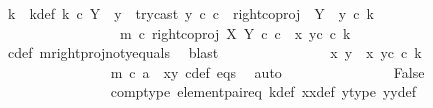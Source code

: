 \begin{isabellebody}
\ k\ \ k{\isacharunderscore}{\kern0pt}def{\isacharcolon}{\kern0pt}\ {\isachardoublequoteopen}k\ {\isasymin}\isactrlsub c\ Y\ {\isasymsetminus}\ {\isacharparenleft}{\kern0pt}{\isasymone}{\isacharcomma}{\kern0pt}y{}{\isacharparenright}{\kern0pt}\ {\isasymand}\ try{\isacharunderscore}{\kern0pt}cast\ y{}\ {\isasymcirc}\isactrlsub c\ c\ {\isacharequal}{\kern0pt}\ right{\isacharunderscore}{\kern0pt}coproj\ {\isasymone}\ {\isacharparenleft}{\kern0pt}Y\ {\isasymsetminus}\ {\isacharparenleft}{\kern0pt}{\isasymone}{\isacharcomma}{\kern0pt}y{}{\isacharparenright}{\kern0pt}{\isacharparenright}{\kern0pt}\ {\isasymcirc}\isactrlsub c\ k\ {\isasymand}\ \isanewline
\ \ \ \ \ \ \ \ \ \ \ \ \ \ \ \ \ m\ {\isasymcirc}\isactrlsub c\ right{\isacharunderscore}{\kern0pt}coproj\ X\ Y\ {\isasymcirc}\isactrlsub c\ c\ {\isacharequal}{\kern0pt}\ {\isasymlangle}x{}{\isacharcomma}{\kern0pt}\ y{}\isactrlsup c\ {\isasymcirc}\isactrlsub c\ k{\isasymrangle}{\isachardoublequoteclose}\isanewline
\ \ \ \ \ \ \ \ \ \ \ \ \ \ \isamarkupfalse%
\ c{\isacharunderscore}{\kern0pt}def\ m{\isacharunderscore}{\kern0pt}rightproj{\isacharunderscore}{\kern0pt}not{\isacharunderscore}{\kern0pt}y{}{\isacharunderscore}{\kern0pt}equals\ \isamarkupfalse%
\ blast\isanewline
\ \ \ \ \ \ \ \ \ \ \ \ \isamarkupfalse%
\ \isamarkupfalse%
\ {\isachardoublequoteopen}{\isasymlangle}x{}{\isacharcomma}{\kern0pt}\ y{}{\isasymrangle}\ {\isacharequal}{\kern0pt}\ {\isasymlangle}x{}{\isacharcomma}{\kern0pt}\ y{}\isactrlsup c\ {\isasymcirc}\isactrlsub c\ k{\isasymrangle}{\isachardoublequoteclose}\isanewline
\ \ \ \ \ \ \ \ \ \ \ \ \ \ \isamarkupfalse%
\ {\isacartoucheopen}m\ {\isasymcirc}\isactrlsub c\ a\ {\isacharequal}{\kern0pt}\ {\isasymlangle}x{}{\isacharcomma}{\kern0pt}y{}{\isasymrangle}{\isacartoucheclose}\ c{\isacharunderscore}{\kern0pt}def\ eqs\ \isamarkupfalse%
\ auto\isanewline
\ \ \ \ \ \ \ \ \ \ \ \ \isamarkupfalse%
\ \isamarkupfalse%
\ False\isanewline
\ \ \ \ \ \ \ \ \ \ \ \ \ \ \isamarkupfalse%
\ comp{\isacharunderscore}{\kern0pt}type\ element{\isacharunderscore}{\kern0pt}pair{\isacharunderscore}{\kern0pt}eq\ k{\isacharunderscore}{\kern0pt}def\ x{}x{}{\isacharunderscore}{\kern0pt}def\ y{}{\isacharprime}{\kern0pt}{\isacharunderscore}{\kern0pt}type\ y{}y{}{\isacharunderscore}{\kern0pt}def{\isacharparenleft}{\kern0pt}{}{\isacharparenright}{\kern0pt}\ \isamarkupfalse%

\end{isabellebody}
